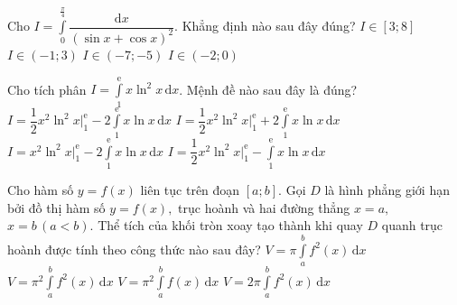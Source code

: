 \begin{ex}%
	Cho $\displaystyle I=\int\limits_{0}^{\frac{\pi}{4}} \dfrac{\mathrm{d}x}{\left (\sin x +\cos x\right )^2}$. Khẳng định nào sau đây đúng?
	\choice
	{$I \in [3;8]$}
	{\True $I \in (-1;3)$}
	{$I \in (-7;-5)$}
	{$I \in (-2;0)$}
\end{ex}


\begin{ex}%
	Cho tích phân $I=\displaystyle\int\limits_1^{\mathrm{e}}{x\ln^2x \mathrm{\,d}x}$. Mệnh đề nào sau đây là đúng?
	\choice
	{$I=\dfrac{1}{2} x^2\ln^2x\bigg|_1^{\mathrm{e}}-2\displaystyle\int\limits_1^{\mathrm{e}}{x\ln x\mathrm{\,d}x}$}
	{$I=\dfrac{1}{2} x^2\ln^2x\bigg|_1^{\mathrm{e}}+2\displaystyle\int\limits_1^{\mathrm{e}}{x\ln x\mathrm{\,d}x}$}
	{$I=x^2\ln^2x\bigg|_1^{\mathrm{e}}-2\displaystyle\int\limits_1^{\mathrm{e}}{x\ln x\mathrm{\,d}x}$}
	{\True $I=\dfrac{1}{2} x^2\ln^2x\bigg|_1^{\mathrm{e}}-\displaystyle\int\limits_1^{\mathrm{e}}{x\ln x\mathrm{\,d}x}$}
\end{ex}

\begin{ex}%
	Cho hàm số $y=f(x)$ liên tục trên đoạn $[a;b].$ Gọi $D$ là hình phẳng giới hạn bởi đồ thị hàm số $y=f(x),$ trục hoành và hai đường thẳng $x=a,$ $x=b\, (a<b).$ Thể tích của khối tròn xoay tạo thành khi quay $D$ quanh trục hoành được tính theo công thức nào sau đây?
	\choice
	{\True $V=\pi\displaystyle\int\limits_{a}^{b}f^2(x)\mathrm{\,d}x$}
	{$V=\pi^2\displaystyle\int\limits_{a}^{b}f^2(x)\mathrm{\,d}x$}
	{$V=\pi^2\displaystyle\int\limits_{a}^{b}f(x)\mathrm{\,d}x$}
	{$V=2\pi\displaystyle\int\limits_{a}^{b}f^2(x)\mathrm{\,d}x$}
\end{ex}

